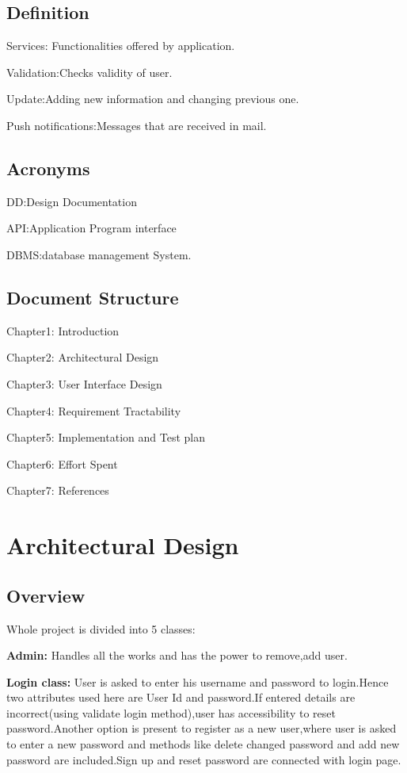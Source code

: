 \documentclass[11pt, english]{article}
\begin{document}
\subsection{Definition}
\item Services: Functionalities offered by application.
\item Validation:Checks validity of user.
\item Update:Adding new information and changing previous one.
\item Push notifications:Messages that are received in mail.

\subsection{Acronyms}
\item DD:Design Documentation
\item API:Application Program interface
\item DBMS:database management System.


\subsection{Document Structure}
\item Chapter1: Introduction
\item Chapter2: Architectural  Design
\item Chapter3: User Interface Design
\item Chapter4: Requirement Tractability
\item Chapter5: Implementation and Test plan
\item Chapter6: Effort Spent
\item Chapter7: References

\section{Architectural Design}
\subsection{Overview}
Whole project is divided into 5 classes:
\newline
\item\textbf{Admin:}
\newline
\newline Handles all the works and has the power to remove,add user.
\newline
\item\textbf{Login class:}
\newline
\newline User is asked to enter his username and password to login.Hence two attributes used here are User Id and password.If entered details are incorrect(using validate login method),user has accessibility to reset password.Another option is present to register as a new user,where user is asked to enter a new password and methods like delete changed password and add new password are included.Sign up and reset password are connected with login page.
\end{document}
